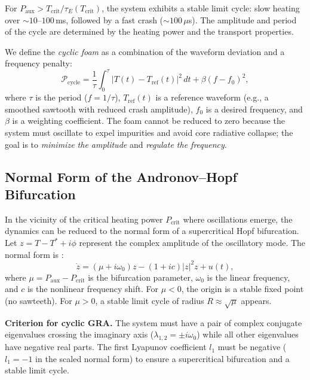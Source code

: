 \documentclass[12pt,a4paper]{article}
\begin{document}
For $P_{\text{aux}} > T_{\text{crit}}/\tau_E(T_{\text{crit}})$, the system exhibits a stable limit cycle: slow heating over $\sim10$--$100$\,ms, followed by a fast crash ($\sim100\,\mu$s). The amplitude and period of the cycle are determined by the heating power and the transport properties.

We define the \textit{cyclic foam} as a combination of the waveform deviation and a frequency penalty:
\begin{equation}
\mathcal{P}_{\text{cycle}} = \frac{1}{\tau} \int_{0}^{\tau} \big| T(t) - T_{\text{ref}}(t) \big|^2 \, dt + \beta (f - f_0)^2,
\label{eq:Pcycle}
\end{equation}
where $\tau$ is the period ($f=1/\tau$), $T_{\text{ref}}(t)$ is a reference waveform (e.g., a smoothed sawtooth with reduced crash amplitude), $f_0$ is a desired frequency, and $\beta$ is a weighting coefficient. The foam cannot be reduced to zero because the system must oscillate to expel impurities and avoid core radiative collapse; the goal is to \textit{minimize the amplitude} and \textit{regulate the frequency}.

\subsection{Normal Form of the Andronov--Hopf Bifurcation}

In the vicinity of the critical heating power $P_{\text{crit}}$ where oscillations emerge, the dynamics can be reduced to the normal form of a supercritical Hopf bifurcation. Let $z = T - T^* + i\phi$ represent the complex amplitude of the oscillatory mode. The normal form is \cite{Kuznetsov2004}:
\begin{equation}
\dot{z} = (\mu + i\omega_0) z - (1 + ic) |z|^2 z + u(t),
\label{eq:hopf}
\end{equation}
where $\mu = P_{\text{aux}} - P_{\text{crit}}$ is the bifurcation parameter, $\omega_0$ is the linear frequency, and $c$ is the nonlinear frequency shift. For $\mu < 0$, the origin is a stable fixed point (no sawteeth). For $\mu > 0$, a stable limit cycle of radius $R \approx \sqrt{\mu}$ appears.

\textbf{Criterion for cyclic GRA.} The system must have a pair of complex conjugate eigenvalues crossing the imaginary axis ($\lambda_{1,2} = \pm i\omega_0$) while all other eigenvalues have negative real parts. The first Lyapunov coefficient $l_1$ must be negative ($l_1 = -1$ in the scaled normal form) to ensure a supercritical bifurcation and a stable limit cycle.
\end{document}
